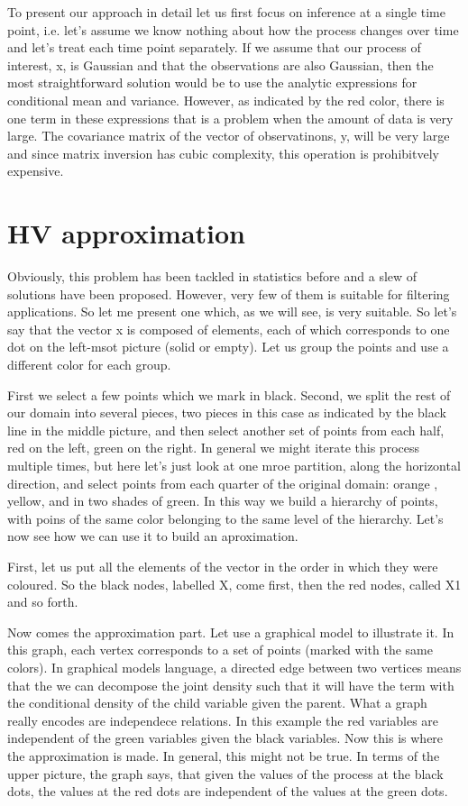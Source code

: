 \documentclass[12pt]{article} %
\begin{document}
To present our approach in detail let us first focus on inference at a single time point, i.e. let's assume we know nothing about how the process changes over time and let's treat each time point separately. If we assume that our process of interest, x, is Gaussian and that the observations are also Gaussian, then the most straightforward solution would be to use the analytic expressions for conditional mean and variance. However, as indicated by the red color, there is one term in these expressions that is a problem when the amount of data is very large. The covariance matrix of the vector of observatinons, y, will be very large and since matrix inversion has cubic complexity, this operation is prohibitvely expensive. 




\newpage
\section*{HV approximation}

Obviously, this problem has been tackled in statistics before and a slew of solutions have been proposed. However, very few of them is suitable for filtering applications. So let me present one which, as we will see, is very suitable. So let's say that the vector x is composed of elements, each of which corresponds to one dot on the left-msot picture (solid or empty). Let us group the points and use a different color for each group. 

First we select a few points which we mark in black. Second, we split the rest of our domain into several pieces, two pieces in this case as indicated by the black line in the middle picture, and then select another set of points from each half, red on the left, green on the right. In general we might iterate this process multiple times, but here let's just look at one mroe partition, along the horizontal direction, and select points from each quarter of the original domain: orange , yellow, and in two shades of green. In this way we build a hierarchy of points, with poins of the same color belonging to the same level of the hierarchy. Let's now see how we can use it to build an aproximation. 

First, let us put all the elements  of the vector in the order in which they were coloured. So the black nodes, labelled X, come first, then the red nodes, called X1 and so forth.

Now comes the approximation part. Let use a graphical model to illustrate it. In this graph, each vertex corresponds to a set of points (marked with the same colors). In graphical models language, a directed edge between two vertices means that the we can decompose the joint density such that it will have the term with the conditional density of the child variable given the parent. What a graph really encodes are independece relations. In this example the red variables are independent of the green variables given the black variables. Now this is where the approximation is made. In general, this might not be true. In terms of the upper picture, the graph says, that given the values of the process at the black dots, the values at the red dots are independent of the values at the green dots. 
\end{document}

